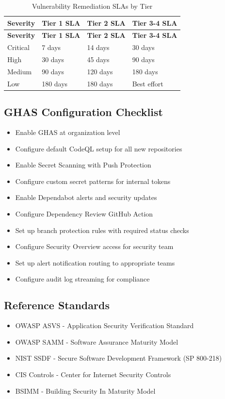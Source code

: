 \documentclass[11pt]{article}
\begin{document}
\begin{longtable}{p{}p{}p{}p{}}
\caption{Vulnerability Remediation SLAs by Tier}\label{tab:slas}\\
\toprule
\textbf{Severity} & \textbf{Tier 1 SLA} & \textbf{Tier 2 SLA} & \textbf{Tier 3-4 SLA} \\
\midrule
\endfirsthead
\toprule
\textbf{Severity} & \textbf{Tier 1 SLA} & \textbf{Tier 2 SLA} & \textbf{Tier 3-4 SLA} \\
\midrule
\endhead
\bottomrule
\endfoot
Critical & 7 days & 14 days & 30 days \\
High & 30 days & 45 days & 90 days \\
Medium & 90 days & 120 days & 180 days \\
Low & 180 days & 180 days & Best effort \\
\end{longtable}

\subsection{GHAS Configuration Checklist}

\begin{itemize}[leftmargin=*]
\item Enable GHAS at organization level
\item Configure default CodeQL setup for all new repositories
\item Enable Secret Scanning with Push Protection
\item Configure custom secret patterns for internal tokens
\item Enable Dependabot alerts and security updates
\item Configure Dependency Review GitHub Action
\item Set up branch protection rules with required status checks
\item Configure Security Overview access for security team
\item Set up alert notification routing to appropriate teams
\item Configure audit log streaming for compliance
\end{itemize}
\subsection{Reference Standards}

\begin{itemize}[leftmargin=*]
\item OWASP ASVS - Application Security Verification Standard
\item OWASP SAMM - Software Assurance Maturity Model
\item NIST SSDF - Secure Software Development Framework (SP 800-218)
\item CIS Controls - Center for Internet Security Controls
\item BSIMM - Building Security In Maturity Model
\end{itemize}
\end{document}
